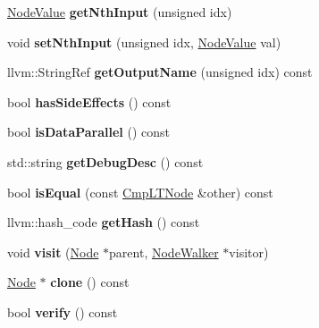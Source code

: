 \begin{DoxyCompactItemize}
\mbox{\label{classglow_1_1_cmp_l_t_node_a94e1dd55428e682cf427ac2cb54291b8}} 
\hyperlink{structglow_1_1_node_value}{Node\+Value} {\bfseries get\+Nth\+Input} (unsigned idx)
\item 
\mbox{\label{classglow_1_1_cmp_l_t_node_a278501da9d1ad09c0d414e65cbf9cf37}} 
void {\bfseries set\+Nth\+Input} (unsigned idx, \hyperlink{structglow_1_1_node_value}{Node\+Value} val)
\item 
\mbox{\label{classglow_1_1_cmp_l_t_node_a5a3ef7abc4ac0d342399372ba757b364}} 
llvm\+::\+String\+Ref {\bfseries get\+Output\+Name} (unsigned idx) const
\item 
\mbox{\label{classglow_1_1_cmp_l_t_node_a68c37776b16c2983f549785263028780}} 
bool {\bfseries has\+Side\+Effects} () const
\item 
\mbox{\label{classglow_1_1_cmp_l_t_node_a54e4574c910e7139f3db90dc7cec7cb2}} 
bool {\bfseries is\+Data\+Parallel} () const
\item 
\mbox{\label{classglow_1_1_cmp_l_t_node_a793f62056eb1a6951939a0e663c897c2}} 
std\+::string {\bfseries get\+Debug\+Desc} () const
\item 
\mbox{\label{classglow_1_1_cmp_l_t_node_a30a928cd21ff82517ef5b6b4ae8d4cb3}} 
bool {\bfseries is\+Equal} (const \hyperlink{classglow_1_1_cmp_l_t_node}{Cmp\+L\+T\+Node} \&other) const
\item 
\mbox{\label{classglow_1_1_cmp_l_t_node_aef3b577c7abef7ae57fc858f584ec8cf}} 
llvm\+::hash\+\_\+code {\bfseries get\+Hash} () const
\item 
\mbox{\label{classglow_1_1_cmp_l_t_node_a97b58c212c3302d0c05875c80c65869e}} 
void {\bfseries visit} (\hyperlink{classglow_1_1_node}{Node} $\ast$parent, \hyperlink{classglow_1_1_node_walker}{Node\+Walker} $\ast$visitor)
\item 
\mbox{\label{classglow_1_1_cmp_l_t_node_a8a0cca349a4b9f8c6a3d0eb8df01cd7b}} 
\hyperlink{classglow_1_1_node}{Node} $\ast$ {\bfseries clone} () const
\item 
\mbox{\label{classglow_1_1_cmp_l_t_node_a12944d1ab6b4d78a8c3050128e341ebb}} 
bool {\bfseries verify} () const
\end{DoxyCompactItemize}

